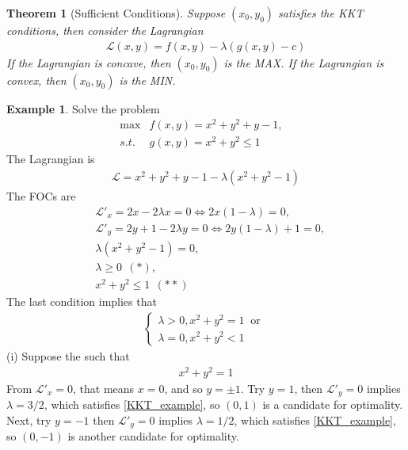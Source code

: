 \documentclass[10pt,a4paper]{book}
\newtheorem{theorem}{Theorem}[section]
\theoremstyle{definition}\newtheorem{definition}{Definition}
\theoremstyle{definition}\newtheorem{fact}{Fact}
\theoremstyle{definition}\newtheorem{ex}{Ex.}
\theoremstyle{definition}\newtheorem{project}{Project}
\theoremstyle{definition}\newtheorem{problem}{Problem}
\theoremstyle{definition}\newtheorem{example}{Example}
\numberwithin{theorem}{chapter}
\numberwithin{corollary}{chapter}
\numberwithin{assumption}{chapter}
\numberwithin{definition}{chapter}
\numberwithin{prop}{chapter}
\numberwithin{notation}{chapter}
\numberwithin{problem}{chapter}
\numberwithin{example}{chapter}
\numberwithin{fact}{chapter}
\numberwithin{ex}{chapter}
\newenvironment{ftheorem}
{\begin{mdframed}\begin{theorem}}
		{\end{theorem}\end{mdframed}}
\begin{document}
	\begin{ftheorem}[Sufficient Conditions]
		Suppose $(x_0, y_0)$ satisfies the KKT conditions, then consider the Lagrangian
		\begin{align*}
			\mathcal{L} (x,y) = f(x,y) - \lambda (g(x,y) - c) 
		\end{align*}
		If the Lagrangian is concave, then $(x_0, y_0)$ is the MAX. If the Lagrangian is convex, then $(x_0, y_0)$ is the MIN. 
	\end{ftheorem}
	
	\begin{example}
		Solve the problem
		\begin{align*}
			\max   & f(x,y) = x^2 + y^2 + y - 1, \\
			s.t. &g(x,y) = x^2 + y^2 \leq 1 &                             
		\end{align*}
		The Lagrangian is
		\begin{align*}
			\mathcal{L} = x^2 + y^2 + y - 1 - \lambda (x^2 + y^2 - 1) 
		\end{align*}
		The FOCs are
		\begin{align*}
			& \mathcal{L}'_x = 2x - 2 \lambda x = 0 \iff 2x(1-\lambda) = 0,         \\
			& \mathcal{L}'_y = 2y + 1 - 2\lambda y = 0 \iff 2y (1-\lambda) + 1 = 0, \\
			& \lambda (x^2 + y^2 - 1) = 0,                                          \\
			& \lambda \geq 0 \ \ (*),                                               \\
			& x^2 + y^2 \leq 1 \ \ (**)                                             
		\end{align*}
		The last condition implies that
		\begin{align}
			\begin{cases}                            
				\lambda > 0, x^2 + y^2 = 1 \ \text{ or } \\
				\lambda = 0, x^2 + y^2 < 1               
			\end{cases} \label{KKT_example}          
		\end{align}
		(i) Suppose the  such that
		\begin{align*}
			x^2 + y^2 = 1 
		\end{align*}
		From $\mathcal{L}'_x=0$, that means $x=0$, and so $y=\pm 1$. Try $y=1$, then $\mathcal{L}'_y = 0$ implies $\lambda=3/2$, which satisfies \ref{KKT_example}, so $(0,1)$ is a candidate for optimality. Next, try $y=-1$ then $\mathcal{L}'_y = 0$ implies $\lambda=1/2$, which satisfies \ref{KKT_example}, so $(0,-1)$ is another candidate for optimality.
		

\end{example}
\end{document}
